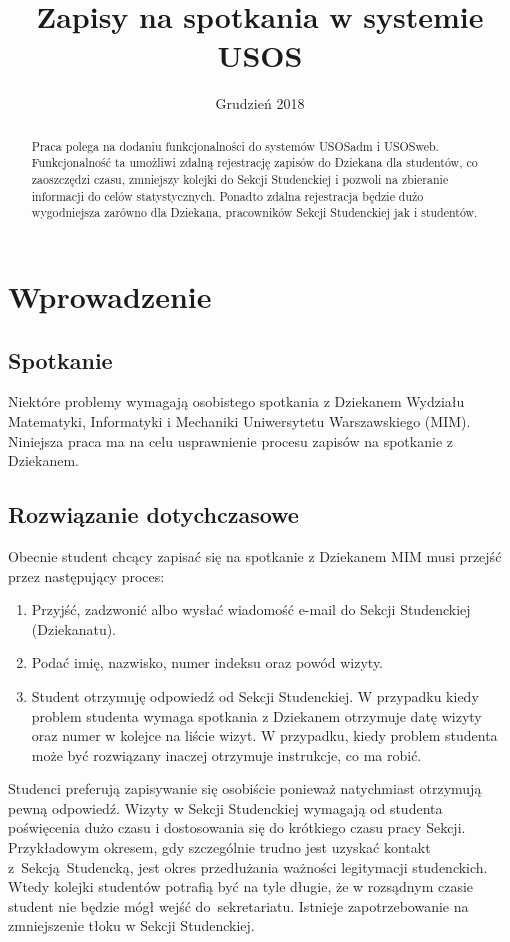 \documentclass[licencjacka]{pracamgr}
\title{Zapisy na spotkania w systemie USOS}
\date{Grudzień 2018}
\begin{document}
\maketitle

\begin{abstract}
  Praca polega na dodaniu funkcjonalności do systemów USOSadm i USOSweb.
  Funkcjonalność ta umożliwi zdalną rejestrację zapisów do Dziekana dla studentów, co zaoszczędzi czasu, zmniejszy kolejki do Sekcji Studenckiej i pozwoli na zbieranie informacji do celów statystycznych.
  Ponadto zdalna rejestracja będzie dużo wygodniejsza zarówno dla Dziekana, pracowników Sekcji Studenckiej jak i studentów.
\end{abstract}

\tableofcontents

\chapter{Wprowadzenie}
\section{Spotkanie}
Niektóre problemy wymagają osobistego spotkania z Dziekanem Wydziału Matematyki, Informatyki i Mechaniki Uniwersytetu Warszawskiego (MIM). Niniejsza praca ma na celu usprawnienie procesu zapisów na spotkanie z Dziekanem.
\section{Rozwiązanie dotychczasowe}
Obecnie student chcący zapisać się na spotkanie z Dziekanem MIM musi przejść przez następujący proces:
\begin{enumerate}
\item Przyjść, zadzwonić albo wysłać wiadomość e-mail do Sekcji Studenckiej (Dziekanatu).
\item Podać imię, nazwisko, numer indeksu oraz powód wizyty.
\item Student otrzymuję odpowiedź od Sekcji Studenckiej. W przypadku kiedy problem studenta wymaga spotkania z Dziekanem otrzymuje datę wizyty oraz numer w kolejce na liście wizyt. W przypadku, kiedy problem studenta może być rozwiązany inaczej otrzymuje instrukcje, co ma robić.
\end{enumerate}
Studenci preferują zapisywanie się osobiście ponieważ natychmiast otrzymują pewną odpowiedź. Wizyty w Sekcji Studenckiej wymagają od studenta poświęcenia dużo czasu i dostosowania się do krótkiego czasu pracy Sekcji. Przykładowym okresem, gdy szczególnie trudno jest uzyskać kontakt z~Sekcją~Studencką, jest okres przedłużania ważności legitymacji studenckich. Wtedy kolejki studentów potrafią być na tyle długie, że w rozsądnym czasie student nie będzie mógł wejść do~sekretariatu. Istnieje zapotrzebowanie na zmniejszenie tłoku w Sekcji Studenckiej.
\end{document}
